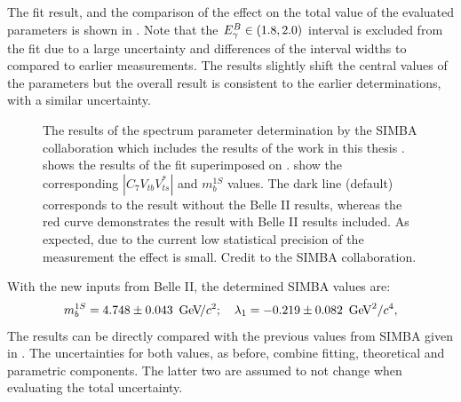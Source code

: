 The fit result, and the comparison of the effect on the total value of the evaluated parameters is shown in .
Note that the ${E^B_{\gamma}}\in(1.8,2.0)$ interval is excluded from the fit due to a large uncertainty and differences of the interval widths
to compared to earlier \BtoXsgamma measurements.
The results slightly shift the central values of the parameters but the overall result is consistent to the earlier determinations,
with a similar uncertainty.
\begin{figure}[htbp!]
    \centering
    \caption{\label{fig:simba_c7}
    The results of the \BtoXsgamma spectrum parameter determination by the SIMBA collaboration which includes the results of the work in this thesis
    \cite{Bernlochner:2020jlt}.
     shows the results of the fit superimposed on .
     show the corresponding $|C_7V_{tb}V^*_{ts}|$ and $m_b^{1S}$ values.
    The dark line (default) corresponds to the result without the Belle II results, whereas the red curve demonstrates the result with Belle II results included.
    As expected, due to the current low statistical precision of the \BtoXsgamma measurement the effect is small.
    Credit to the SIMBA collaboration.
    }
\end{figure}


With the new inputs from Belle II, the determined SIMBA values are:
\begin{equation}\label{eq:new_simba_values}
    m_b^{1S}= 4.748\pm0.043~{\mathrm{\,Ge\kern -0.1em V\!/}c^2}; \quad \lambda_1 = -0.219\pm0.082~\mathrm{\,Ge\kern -0.1em V}^2/c^4,
\end{equation}
The results can be directly compared with the previous values from SIMBA given in .
The uncertainties for both values, as before, combine fitting, theoretical and parametric components.
The latter two are assumed to not change when evaluating the total uncertainty.

